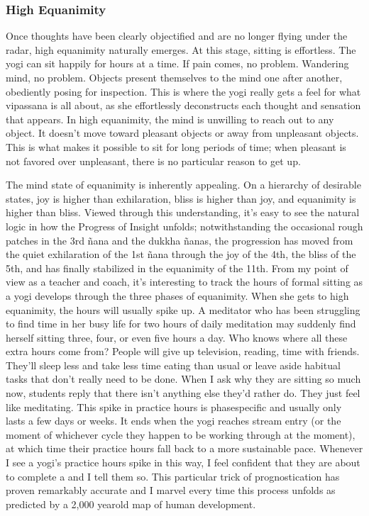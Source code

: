 \documentclass[a5paper,10pt,english]{book}
\begin{document}
\subsubsection{High Equanimity}
\label{\detokenize{main-2:high-equanimity}}
\sphinxAtStartPar
Once thoughts have been clearly objectified and are no longer flying
under the radar, high equanimity naturally emerges. At this stage,
sitting is effortless. The yogi can sit happily for hours at a time. If
pain comes, no problem. Wandering mind, no problem. Objects present
themselves to the mind one after another, obediently posing for
inspection. This is where the yogi really gets a feel for what vipassana
is all about, as she effortlessly deconstructs each thought and
sensation that appears. In high equanimity, the mind is unwilling to
reach out to any object. It doesn’t move toward pleasant objects or away
from unpleasant objects. This is what makes it possible to sit for long
periods of time; when pleasant is not favored over unpleasant, there is
no particular reason to get up.

\sphinxAtStartPar
The mind state of equanimity is inherently appealing. On a hierarchy of
desirable states, joy is higher than exhilaration, bliss is higher than
joy, and equanimity is higher than bliss. Viewed through this
understanding, it’s easy to see the natural logic in how the Progress of
Insight unfolds; notwithstanding the occasional rough patches in the 3rd
ñana and the dukkha ñanas, the progression has moved from the quiet
exhilaration of the 1st ñana through the joy of the 4th, the bliss of
the 5th, and has finally stabilized in the equanimity of the 11th. From
my point of view as a teacher and coach, it’s interesting to track the
hours of formal sitting as a yogi develops through the three phases of
equanimity. When she gets to high equanimity, the hours will usually
spike up. A meditator who has been struggling to find time in her busy
life for two hours of daily meditation may suddenly find herself sitting
three, four, or even five hours a day. Who knows where all these extra
hours come from? People will give up television, reading, time with
friends. They’ll sleep less and take less time eating than usual or
leave aside habitual tasks that don’t really need to be done. When I ask
why they are sitting so much now, students reply that there isn’t
anything else they’d rather do. They just feel like meditating. This
spike in practice hours is phase\sphinxhyphen{}specific and usually only lasts a few
days or weeks. It ends when the yogi reaches stream entry (or the 
moment of whichever cycle they happen to be working through at the
moment), at which time their practice hours fall back to a more
sustainable pace. Whenever I see a yogi’s practice hours spike in this
way, I feel confident that they are about to complete a  and I
tell them so. This particular trick of prognostication has proven
remarkably accurate and I marvel every time this process unfolds as
predicted by a 2,000 year\sphinxhyphen{}old map of human development.
\end{document}
